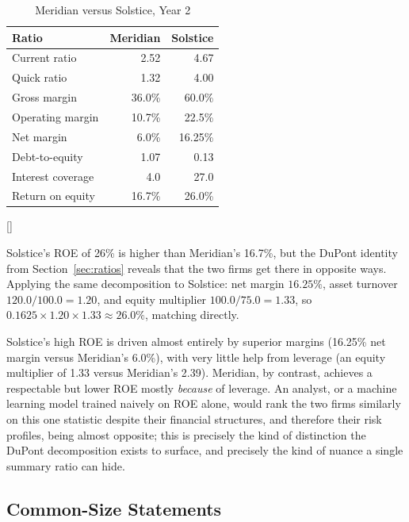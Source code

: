 \documentclass[../ai_in_finance]{subfiles}
\begin{document}
\begin{table}[htbp]
\centering
\begin{lrbox}{\bookmeasuredbox}
\begin{tabular}{lrr}
\toprule
Ratio & Meridian & Solstice \\
\midrule
Current ratio & 2.52 & 4.67 \\
Quick ratio & 1.32 & 4.00 \\
Gross margin & 36.0\% & 60.0\% \\
Operating margin & 10.7\% & 22.5\% \\
Net margin & 6.0\% & 16.25\% \\
Debt-to-equity & 1.07 & 0.13 \\
Interest coverage & 4.0 & 27.0 \\
Return on equity & 16.7\% & 26.0\% \\
\bottomrule
\end{tabular}
\end{lrbox}
\ifdim\wd\bookmeasuredbox<0.65\linewidth
\setlength{\bookcapwidth}{0.65\linewidth}
\else
\setlength{\bookcapwidth}{\wd\bookmeasuredbox}
\fi
{}[\bookcapwidth]{
\usebox{\bookmeasuredbox}
}{
\caption{Meridian versus Solstice, Year 2}
\label{tab:comparison}
}
\end{table}

Solstice's ROE of 26\% is higher than Meridian's 16.7\%, but the DuPont identity from Section~\ref{sec:ratios} reveals that the two firms get there in opposite ways. Applying the same decomposition to Solstice: net margin $16.25\%$, asset turnover $120.0/100.0 = 1.20$, and equity multiplier $100.0/75.0 = 1.33$, so $0.1625 \times 1.20 \times 1.33 \approx 26.0\%$, matching directly.

Solstice's high ROE is driven almost entirely by superior margins (16.25\% net margin versus Meridian's 6.0\%), with very little help from leverage (an equity multiplier of 1.33 versus Meridian's 2.39). Meridian, by contrast, achieves a respectable but lower ROE mostly \emph{because} of leverage. An analyst, or a machine learning model trained naively on ROE alone, would rank the two firms similarly on this one statistic despite their financial structures, and therefore their risk profiles, being almost opposite; this is precisely the kind of distinction the DuPont decomposition exists to surface, and precisely the kind of nuance a single summary ratio can hide.

\subsection{Common-Size Statements}
\end{document}
